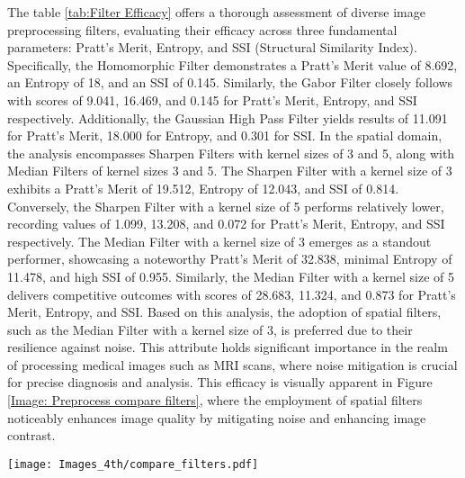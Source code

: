 The table \ref{tab:Filter Efficacy} offers a thorough assessment of diverse image preprocessing filters, evaluating their efficacy across three fundamental parameters: Pratt's Merit, Entropy, and SSI (Structural Similarity Index). Specifically, the Homomorphic Filter demonstrates a Pratt's Merit value of 8.692, an Entropy of 18, and an SSI of 0.145. Similarly, the Gabor Filter closely follows with scores of 9.041, 16.469, and 0.145 for Pratt's Merit, Entropy, and SSI respectively. Additionally, the Gaussian High Pass Filter yields results of 11.091 for Pratt's Merit, 18.000 for Entropy, and 0.301 for SSI. In the spatial domain, the analysis encompasses Sharpen Filters with kernel sizes of 3 and 5, along with Median Filters of kernel sizes 3 and 5. The Sharpen Filter with a kernel size of 3 exhibits a Pratt's Merit of 19.512, Entropy of 12.043, and SSI of 0.814. Conversely, the Sharpen Filter with a kernel size of 5 performs relatively lower, recording values of 1.099, 13.208, and 0.072 for Pratt's Merit, Entropy, and SSI respectively. The Median Filter with a kernel size of 3 emerges as a standout performer, showcasing a noteworthy Pratt's Merit of 32.838, minimal Entropy of 11.478, and high SSI of 0.955. Similarly, the Median Filter with a kernel size of 5 delivers competitive outcomes with scores of 28.683, 11.324, and 0.873 for Pratt's Merit, Entropy, and SSI. Based on this analysis, the adoption of spatial filters, such as the Median Filter with a kernel size of 3, is preferred due to their resilience against noise. This attribute holds significant importance in the realm of processing medical images such as MRI scans, where noise mitigation is crucial for precise diagnosis and analysis. This efficacy is visually apparent in Figure \ref{Image: Preprocess compare filters}, where the employment of spatial filters noticeably enhances image quality by mitigating noise and enhancing image contrast.

\begin{figure*}[!h]
  \centering
   \texttt{[image: Images\_4th/compare\_filters.pdf]}
    \caption{Comparison of Various Image Preprocessing Filters: Illustration depicting the comparative effectiveness of diverse preprocessing filters, encompassing both spatial and frequency-based variants.}
  \label{Image: Preprocess compare filters}
\end{figure*}

